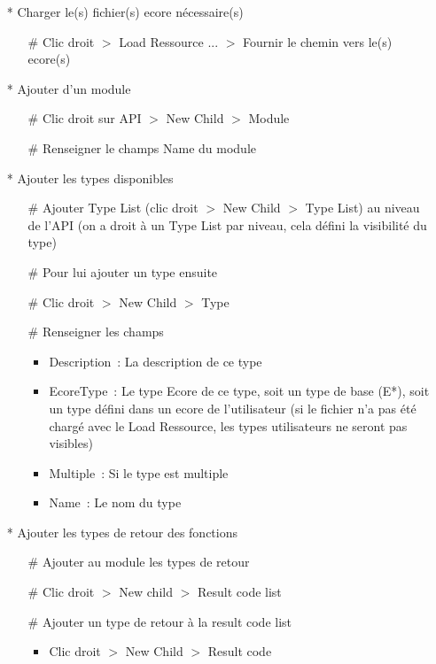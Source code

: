 \documentclass{article}
\begin{document}
\begin{itemize}
\item[*] Charger le(s) fichier(s) ecore n\'ecessaire(s)
  \begin{itemize}
  \item[\#] Clic droit $>$ Load Ressource ... $>$ Fournir le chemin vers le(s) ecore(s)
  \end{itemize}
\item[*] Ajouter d'un module
  \begin{itemize}
  \item[\#] Clic droit sur API $>$ New Child $>$ Module
  \item[\#] Renseigner le champs Name du module
  \end{itemize}
\item[*] Ajouter les types disponibles
  \begin{itemize}
  \item[\#] Ajouter Type List (clic droit $>$ New Child $>$ Type List) au niveau de l'API (on a droit \`a un Type List par niveau, cela d\'efini la visibilit\'e du type)
  \item[\#] Pour lui ajouter un type ensuite
  \item[\#] Clic droit $>$ New Child $>$ Type
  \item[\#] Renseigner les champs
    \begin{itemize}
    \item Description~: La description de ce type
    \item EcoreType~: Le type Ecore de ce type, soit un type de base (E*), soit un type d\'efini dans un ecore de l'utilisateur (si le fichier n'a pas \'et\'e charg\'e avec le Load Ressource, les types utilisateurs ne seront pas visibles)
    \item Multiple~: Si le type est multiple
    \item Name~: Le nom du type
    \end{itemize}
  \end{itemize}
\item[*] Ajouter les types de retour des fonctions
  \begin{itemize}
  \item[\#] Ajouter au module les types de retour
  \item[\#] Clic droit $>$ New child $>$ Result code list
  \item[\#] Ajouter un type de retour \`a la result code list
    \begin{itemize}
    \item Clic droit $>$ New Child $>$ Result code

\end{itemize}
\end{itemize}
\end{itemize}
\end{document}
